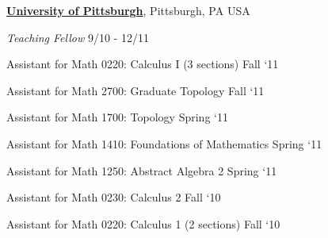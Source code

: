 \documentclass[10pt]{article}
\newlength{\footpageshift}
\newenvironment{outerlist}[1][\enskip\textbullet]%
        {\begin{itemize}[#1]}{\end{itemize}%
         \vspace{-.6\baselineskip}}
\newenvironment{innerlist}[1][\enskip\textbullet]%
        {\begin{compactitem}[#1]}{\end{compactitem}}
\begin{document}
%
\newpage
\href{http://www.pitt.edu}{\textbf{University of Pittsburgh}},
Pittsburgh, PA USA
\begin{outerlist}

\item[] \textit{Teaching Fellow}%
\hspace{\footpageshift}\textrm{9/10 - 12/11}
    \begin{innerlist}[-]
     \item Assistant for Math 0220: Calculus I  (3 sections) \hfill Fall `11
     \item Assistant for Math 2700: Graduate Topology \hfill Fall `11
    \item Assistant for Math 1700: Topology \hfill Spring `11
    \item Assistant for Math 1410: Foundations of Mathematics \hfill Spring `11
    \item Assistant for Math 1250: Abstract Algebra 2 \hfill Spring `11
        \item Assistant for Math 0230: Calculus 2 \hfill Fall `10



        \item Assistant for Math 0220:  Calculus 1  (2 sections) \hfill Fall `10



\end{innerlist}
\end{outerlist}
\end{document}
